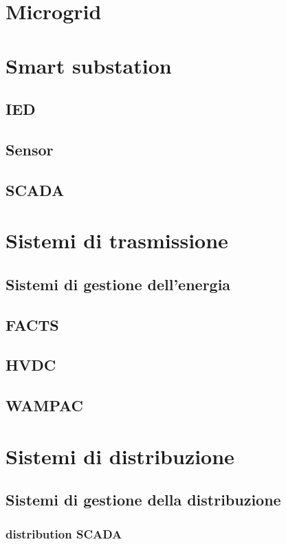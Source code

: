 \section{Microgrid}



\section{Smart substation}

\subsection{IED}
\subsection{Sensor}
\subsection{SCADA}



\section{Sistemi di trasmissione}

\subsection{Sistemi di gestione dell'energia}
\subsection{FACTS}
\subsection{HVDC}
\subsection{WAMPAC}


\section{Sistemi di distribuzione}

\subsection{Sistemi di gestione della distribuzione}
\subsubsection{distribution SCADA}
